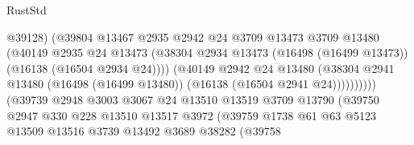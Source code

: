 \begin{lexlean}{RustStd}
\begin{coremodule}
                                          @39128)
                                        (@39804
                                          @13467
                                          @2935
                                          @2942
                                          @24
                                          @3709
                                          @13473
                                          @3709
                                          @13480
                                          (@40149
                                            @2935
                                            @24
                                            @13473
                                            (@38304
                                              @2934
                                              @13473
                                              (@16498 (@16499 @13473))
                                              (@16138 (@16504 @2934 @24))))
                                          (@40149
                                            @2942
                                            @24
                                            @13480
                                            (@38304
                                              @2941
                                              @13480
                                              (@16498 (@16499 @13480))
                                              (@16138 (@16504 @2941 @24))))))))))
                              (@39739
                                @2948
                                @3003
                                @3067
                                @24
                                @13510
                                @13519
                                @3709
                                @13790
                                (@39750
                                  @2947
                                  @330
                                  @228
                                  @13510
                                  @13517
                                  @3972
                                  (@39759
                                    @1738
                                    @61
                                    @63
                                    @5123
                                    @13509
                                    @13516
                                    @3739
                                    @13492
                                    @3689
                                    @38282
                                    (@39758

\end{coremodule}
\end{lexlean}
